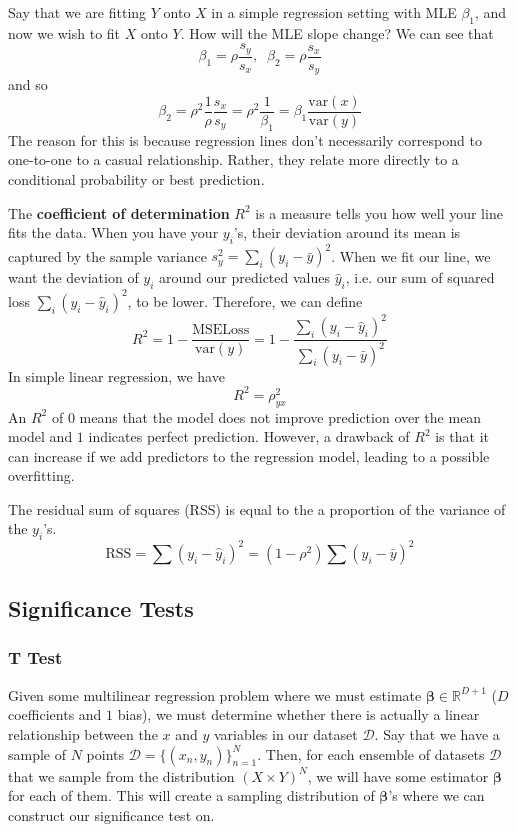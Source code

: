 \documentclass{article}
\begin{document}
    \begin{example}
    Say that we are fitting $Y$ onto $X$ in a simple regression setting with MLE $\beta_1$, and now we wish to fit $X$ onto $Y$. How will the MLE slope change? We can see that 
    \[\beta_1 = \rho \frac{s_y}{s_x} , \;\; \beta_2 = \rho \frac{s_x}{s_y}\]
    and so 
    \[\beta_2 = \rho^2 \frac{1}{\rho} \frac{s_x}{s_y} = \rho^2 \frac{1}{\beta_1} = \beta_1 \frac{\mathrm{var}(x)}{\mathrm{var}(y)}\]
    The reason for this is because regression lines don't necessarily correspond to one-to-one to a casual relationship. Rather, they relate more directly to a conditional probability or best prediction. 
    \end{example}

    The \textbf{coefficient of determination} $R^2$ is a measure tells you how well your line fits the data. When you have your $y_i$'s, their deviation around its mean is captured by the sample variance $s^2_y = \sum_i (y_i - \bar{y})^2$. When we fit our line, we want the deviation of $y_i$ around our predicted values $\hat{y}_i$, i.e. our sum of squared loss $\sum_i (y_i - \hat{y}_i)^2$, to be lower. Therefore, we can define 
    \[R^2 = 1 - \frac{\mathrm{MSE Loss}}{\mathrm{var}(y)} = 1 - \frac{\sum_i (y_i - \hat{y}_i)^2}{\sum_i (y_i - \bar{y})^2}\]
    In simple linear regression, we have 
    \[R^2 = \rho_{yx}^2\]
    An $R^2$ of $0$ means that the model does not improve prediction over the mean model and $1$ indicates perfect prediction. However, a drawback of $R^2$ is that it can increase if we add predictors to the regression model, leading to a possible overfitting. 

    \begin{theorem}
    The residual sum of squares (RSS) is equal to the a proportion of the variance of the $y_i$'s. 
    \[\mathrm{RSS} = \sum (y_i - \hat{y}_i)^2 = (1 - \rho^2) \sum (y_i - \bar{y})^2 \]
    \end{theorem}

  \subsection{Significance Tests}

    \subsubsection{T Test}

      Given some multilinear regression problem where we must estimate $\boldsymbol{\beta} \in \mathbb{R}^{D + 1}$ ($D$ coefficients and $1$ bias), we must determine whether there is actually a linear relationship between the $x$ and $y$ variables in our dataset $\mathcal{D}$. Say that we have a sample of $N$ points $\mathcal{D} = \{(x_n, y_n)\}_{n=1}^N$. Then, for each ensemble of datasets $\mathcal{D}$ that we sample from the distribution $(X \times Y)^N$, we will have some estimator $\boldsymbol{\beta}$ for each of them. This will create a sampling distribution of $\boldsymbol{\beta}$'s where we can construct our significance test on. 
\end{document}
